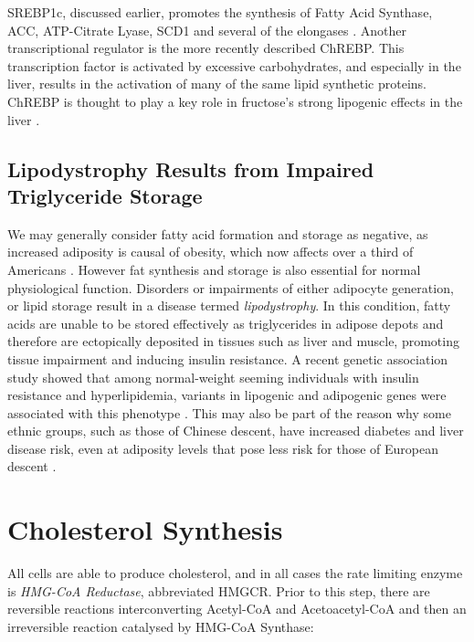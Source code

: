 \documentclass{tufte-handout}
\begin{document}
  SREBP1c, discussed earlier, promotes the synthesis of Fatty Acid Synthase, ACC, ATP-Citrate Lyase, SCD1 and several of the elongases \citep{Horton2002b,Moon2012b}.  Another transcriptional regulator is the more recently described ChREBP.  This transcription factor is activated by excessive carbohydrates, and especially in the liver, results in the activation of many of the same lipid synthetic proteins.  ChREBP is thought to play a key role in fructose's strong lipogenic effects in the liver \citep{Kim2016d}.

\subsection{Lipodystrophy Results from Impaired Triglyceride Storage}

We may generally consider fatty acid formation and storage as negative, as increased adiposity is causal of obesity, which now affects over a third of Americans \citep{Flegal2016}.  However fat synthesis and storage is also essential for normal physiological function.  Disorders or impairments of either adipocyte generation, or lipid storage result in a disease termed \emph{lipodystrophy}.  In this condition, fatty acids are unable to be stored effectively as triglycerides in adipose depots and therefore are ectopically deposited in tissues such as liver and muscle, promoting tissue impairment and inducing insulin resistance.  A recent genetic association study showed that among normal-weight seeming individuals with insulin resistance and hyperlipidemia, variants in lipogenic and adipogenic genes were associated with this phenotype \citep{Lotta2016a}.  This may also be part of the reason why some ethnic groups, such as those of Chinese descent, have increased diabetes and liver disease risk, even at adiposity levels that pose less risk for those of European descent \citep{Chiu2011a}.

\section{Cholesterol Synthesis}

All cells are able to produce cholesterol, and in all cases the rate limiting enzyme is \emph{HMG-CoA Reductase}, abbreviated HMGCR.  Prior to this step, there are reversible reactions interconverting Acetyl-CoA and Acetoacetyl-CoA and then an irreversible reaction catalysed by HMG-CoA Synthase:
\end{document}
